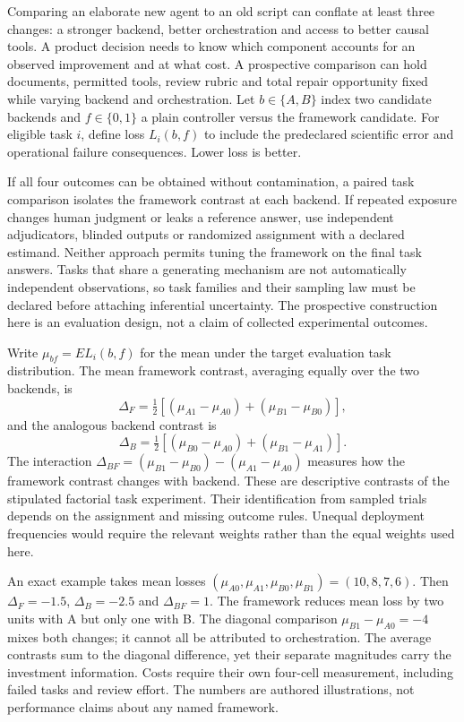 Comparing an elaborate new agent to an old script can conflate at least
three changes: a stronger backend, better orchestration and access to
better causal tools. A product decision needs to know which component
accounts for an observed improvement and at what cost. A prospective
comparison can hold documents, permitted tools, review rubric and total
repair opportunity fixed while varying backend and orchestration. Let
$b\in\{A,B\}$ index two candidate backends and $f\in\{0,1\}$ a plain
controller versus the framework candidate. For eligible task $i$, define
loss $L_i(b,f)$ to include the predeclared scientific error and operational
failure consequences. Lower loss is better.

If all four outcomes can be obtained without contamination, a paired
task comparison isolates the framework contrast at each backend. If
repeated exposure changes human judgment or leaks a reference answer,
use independent adjudicators, blinded outputs or randomized assignment
with a declared estimand. Neither approach permits tuning the framework
on the final task answers. Tasks that share a generating mechanism are
not automatically independent observations, so task families and their
sampling law must be declared before attaching inferential uncertainty.
The prospective construction here is an evaluation design, not a claim
of collected experimental outcomes.
\citep{exec14_l6_adapter_exact}

Write $\mu_{bf}=E{L_i(b,f)}$ for the mean under the target evaluation
task distribution. The mean framework contrast, averaging equally over
the two backends, is
\begin{equation}
 \Delta_F=\tfrac12[(\mu_{A1}-\mu_{A0})+
                              (\mu_{B1}-\mu_{B0})],
\end{equation}
and the analogous backend contrast is
\begin{equation}
 \Delta_B=\tfrac12[(\mu_{B0}-\mu_{A0})+
                              (\mu_{B1}-\mu_{A1})].
\end{equation}
The interaction
$\Delta_{BF}=(\mu_{B1}-\mu_{B0})-(\mu_{A1}-\mu_{A0})$
measures how the framework contrast changes with backend. These are
descriptive contrasts of the stipulated factorial task experiment. Their
identification from sampled trials depends on the assignment and missing
outcome rules. Unequal deployment frequencies would require the relevant
weights rather than the equal weights used here.

An exact example takes mean losses
$(\mu_{A0},\mu_{A1},\mu_{B0},\mu_{B1})=(10,8,7,6)$.
Then $\Delta_F=-1.5$, $\Delta_B=-2.5$ and $\Delta_{BF}=1$.
The framework reduces mean loss by two units with A but only one with B.
The diagonal comparison $\mu_{B1}-\mu_{A0}=-4$ mixes both changes;
it cannot all be attributed to orchestration. The average contrasts
sum to the diagonal difference, yet their separate magnitudes carry the
investment information. Costs require their own four-cell measurement,
including failed tasks and review effort. The numbers are authored
illustrations, not performance claims about any named framework.
\citep{exec14_l6_adapter_exact}

